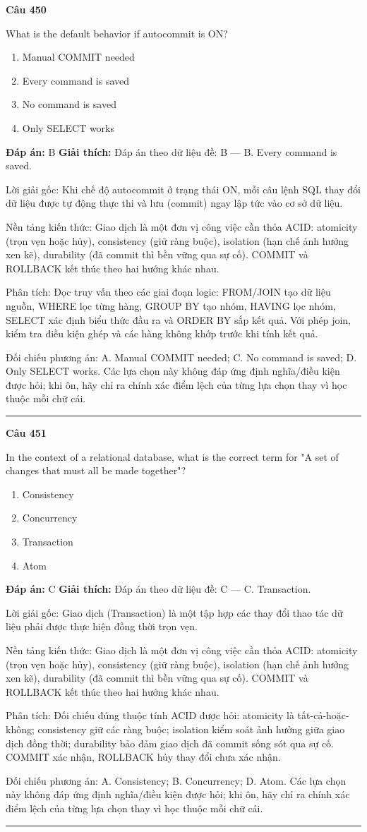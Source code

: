 \documentclass[11pt,a4paper]{article}
\newenvironment{question}[1]{%
  \par\vspace{1em}\noindent\textbf{\large Câu #1}\par\vspace{0.4em}
}{%
  \par\vspace{1em}\hrule\vspace{0.6em}
}
\newenvironment{choices}{%
  \begin{enumerate}[label=\textbf{\Alph*.},leftmargin=2.2em,itemsep=2pt,topsep=3pt]
}{%
  \end{enumerate}
}
\newcommand{\choice}{\item}
\begin{document}
\begin{question}{450}
What is the default behavior if autocommit is ON?
\begin{choices}
\choice Manual COMMIT needed
\choice Every command is saved
\choice No command is saved
\choice Only SELECT works
\end{choices}
\textbf{Đáp án:} B
\textbf{Giải thích:} Đáp án theo dữ liệu đề: B — B. Every command is saved.

Lời giải gốc: Khi chế độ autocommit ở trạng thái ON, mỗi câu lệnh SQL thay đổi dữ liệu được tự động thực thi và lưu (commit) ngay lập tức vào cơ sở dữ liệu.

Nền tảng kiến thức: Giao dịch là một đơn vị công việc cần thỏa ACID: atomicity (trọn vẹn hoặc hủy), consistency (giữ ràng buộc), isolation (hạn chế ảnh hưởng xen kẽ), durability (đã commit thì bền vững qua sự cố). COMMIT và ROLLBACK kết thúc theo hai hướng khác nhau.

Phân tích: Đọc truy vấn theo các giai đoạn logic: FROM/JOIN tạo dữ liệu nguồn, WHERE lọc từng hàng, GROUP BY tạo nhóm, HAVING lọc nhóm, SELECT xác định biểu thức đầu ra và ORDER BY sắp kết quả. Với phép join, kiểm tra điều kiện ghép và các hàng không khớp trước khi tính kết quả.

Đối chiếu phương án: A. Manual COMMIT needed; C. No command is saved; D. Only SELECT works. Các lựa chọn này không đáp ứng định nghĩa/điều kiện được hỏi; khi ôn, hãy chỉ ra chính xác điểm lệch của từng lựa chọn thay vì học thuộc mỗi chữ cái.
\end{question}


\begin{question}{451}
In the context of a relational database, what is the correct term for "A set of changes that must all be made together"?
\begin{choices}
\choice Consistency
\choice Concurrency
\choice Transaction
\choice Atom
\end{choices}
\textbf{Đáp án:} C
\textbf{Giải thích:} Đáp án theo dữ liệu đề: C — C. Transaction.

Lời giải gốc: Giao dịch (Transaction) là một tập hợp các thay đổi thao tác dữ liệu phải được thực hiện đồng thời trọn vẹn.

Nền tảng kiến thức: Giao dịch là một đơn vị công việc cần thỏa ACID: atomicity (trọn vẹn hoặc hủy), consistency (giữ ràng buộc), isolation (hạn chế ảnh hưởng xen kẽ), durability (đã commit thì bền vững qua sự cố). COMMIT và ROLLBACK kết thúc theo hai hướng khác nhau.

Phân tích: Đối chiếu đúng thuộc tính ACID được hỏi: atomicity là tất-cả-hoặc-không; consistency giữ các ràng buộc; isolation kiểm soát ảnh hưởng giữa giao dịch đồng thời; durability bảo đảm giao dịch đã commit sống sót qua sự cố. COMMIT xác nhận, ROLLBACK hủy thay đổi chưa xác nhận.

Đối chiếu phương án: A. Consistency; B. Concurrency; D. Atom. Các lựa chọn này không đáp ứng định nghĩa/điều kiện được hỏi; khi ôn, hãy chỉ ra chính xác điểm lệch của từng lựa chọn thay vì học thuộc mỗi chữ cái.
\end{question}
\end{document}
